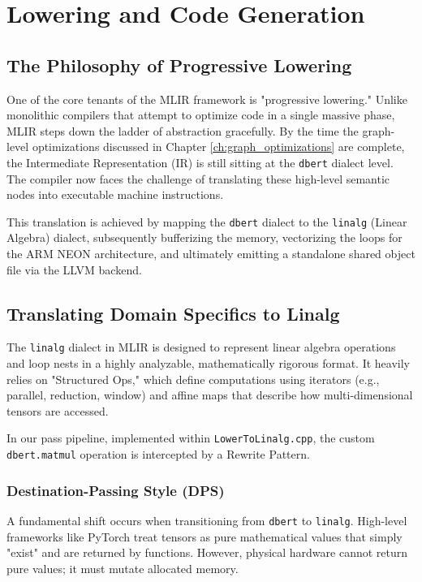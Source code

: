\chapter{Lowering and Code Generation}
\label{ch:lowering_and_codegen}

\section{The Philosophy of Progressive Lowering}
One of the core tenants of the MLIR framework is "progressive lowering." Unlike monolithic compilers that attempt to optimize code in a single massive phase, MLIR steps down the ladder of abstraction gracefully. By the time the graph-level optimizations discussed in Chapter \ref{ch:graph_optimizations} are complete, the Intermediate Representation (IR) is still sitting at the \texttt{dbert} dialect level. The compiler now faces the challenge of translating these high-level semantic nodes into executable machine instructions.

This translation is achieved by mapping the \texttt{dbert} dialect to the \texttt{linalg} (Linear Algebra) dialect, subsequently bufferizing the memory, vectorizing the loops for the ARM NEON architecture, and ultimately emitting a standalone shared object file via the LLVM backend.

\section{Translating Domain Specifics to Linalg}
The \texttt{linalg} dialect in MLIR is designed to represent linear algebra operations and loop nests in a highly analyzable, mathematically rigorous format. It heavily relies on "Structured Ops," which define computations using iterators (e.g., parallel, reduction, window) and affine maps that describe how multi-dimensional tensors are accessed.

In our pass pipeline, implemented within \texttt{LowerToLinalg.cpp}, the custom \texttt{dbert.matmul} operation is intercepted by a Rewrite Pattern. 

\subsection{Destination-Passing Style (DPS)}
A fundamental shift occurs when transitioning from \texttt{dbert} to \texttt{linalg}. High-level frameworks like PyTorch treat tensors as pure mathematical values that simply "exist" and are returned by functions. However, physical hardware cannot return pure values; it must mutate allocated memory.

